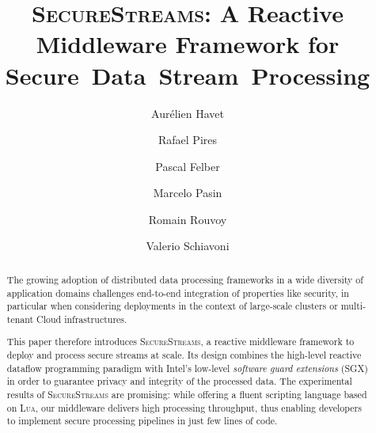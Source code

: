 \documentclass[sigconf,table]{acmart}
\newcommand{\SYS}{\textsc{SecureStreams}\xspace}
\begin{document}
\title{\SYS: A Reactive Middleware Framework for Secure~Data~Stream~Processing}
\date{}

\author{Aur\'elien Havet}

\author{Rafael Pires}

\author{Pascal Felber}

\author{Marcelo Pasin}

\author{Romain Rouvoy}

\author{Valerio Schiavoni}

\renewcommand{\shortauthors}{A. Havet, R. Pires, P. Felber, M. Pasin, R. Rouvoy, V. Schiavoni}


\begin{abstract}
The growing adoption of distributed data processing frameworks in a wide diversity of application domains challenges end-to-end integration of properties like security, in particular when considering deployments in the context of large-scale clusters or multi-tenant Cloud infrastructures.

This paper therefore introduces \SYS{}, a reactive middleware framework to deploy and process secure streams at scale.
Its design combines the high-level reactive dataflow programming paradigm with Intel{\textregistered}'s low-level \emph{software guard extensions} (SGX) in order to guarantee privacy and integrity of the processed data.
The experimental results of \SYS{} are promising: while offering a fluent scripting language based on \textsc{Lua}, our middleware delivers high processing throughput, thus enabling developers to implement secure processing pipelines in just few lines of code.
\end{abstract}
\end{document}
